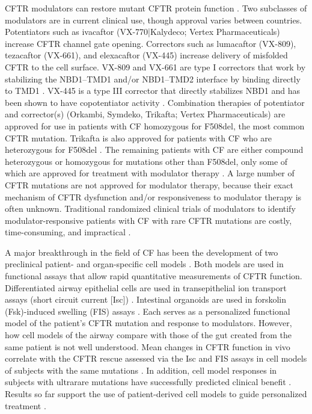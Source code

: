 CFTR modulators can restore mutant CFTR protein function \cite{clancy2019}. Two subclasses of modulators are in current clinical use, though approval varies between countries. Potentiators such as ivacaftor (VX-770|Kalydeco; Vertex Pharmaceuticals) increase CFTR channel gate opening. Correctors such as lumacaftor (VX-809), tezacaftor (VX-661), and elexacaftor (VX-445) increase delivery of misfolded CFTR to the cell surface. VX-809 and VX-661 are type I correctors that work by stabilizing the NBD1–TMD1 and/or NBD1–TMD2 interface by binding directly to TMD1 \cite{loo2013, ren2013}. VX-445 is a type III corrector that directly stabilizes NBD1 and has been shown to have copotentiator activity \cite{shaughnessy2021, laselva2021, veit2021a, okiyoneda2013}. Combination therapies of potentiator and corrector(s) (Orkambi, Symdeko, Trikafta; Vertex Pharmaceuticals) are approved for use in patients with CF homozygous for F508del, the most common CFTR mutation\cite{commissioner2020, fda_symdeko_approval, fda_orkambi_approval}. Trikafta is also approved for patients with CF who are heterozygous for F508del \cite{commissioner2020}. The remaining patients with CF are either compound heterozygous or homozygous for mutations other than F508del, only some of which are approved for treatment with modulator therapy \cite{fda_expansion_rare_mutations}. A large number of CFTR mutations are not approved for modulator therapy, because their exact mechanism of CFTR dysfunction and/or responsiveness to modulator therapy is often unknown. Traditional randomized clinical trials of modulators to identify modulator-responsive patients with CF with rare CFTR mutations are costly, time-consuming, and impractical \cite{bell2020}.

A major breakthrough in the field of CF has been the development of two preclinical patient- and organ-specific cell models \cite{clarke2013, dekkers2016a, martinovich2017}. Both models are used in functional assays that allow rapid quantitative measurements of CFTR function. Differentiated airway epithelial cells are used in transepithelial ion transport assays (short circuit current [Isc]) \cite{pranke2017}. Intestinal organoids are used in forskolin (Fsk)-induced swelling (FIS) assays \cite{dekkers2013a}. Each serves as a personalized functional model of the patient’s CFTR mutation and response to modulators. However, how cell models of the airway compare with those of the gut created from the same patient is not well understood. Mean changes in CFTR function in vivo correlate with the CFTR rescue assessed via the Isc and FIS assays in cell models of subjects with the same mutations \cite{dekkers2016a, pranke2017}. In addition, cell model responses in subjects with ultrarare mutations have successfully predicted clinical benefit \cite{ramalho2021, mccarthy2018, berkers2019}. Results so far support the use of patient-derived cell models to guide personalized treatment \cite{pranke2019a}.

